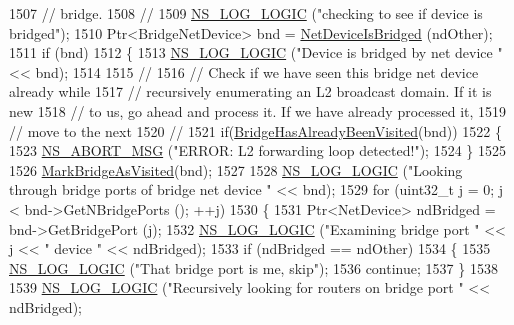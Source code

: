 \begin{DoxyCode}
1507       \textcolor{comment}{// bridge.}
1508       \textcolor{comment}{//}
1509       \hyperlink{group__logging_ga88acd260151caf2db9c0fc84997f45ce}{NS\_LOG\_LOGIC} (\textcolor{stringliteral}{"checking to see if device is bridged"});
1510       Ptr<BridgeNetDevice> bnd = \hyperlink{classns3_1_1GlobalRouter_ad330b65439cd1be39799b52df948f98b}{NetDeviceIsBridged} (ndOther);
1511       \textcolor{keywordflow}{if} (bnd)
1512         \{
1513           \hyperlink{group__logging_ga88acd260151caf2db9c0fc84997f45ce}{NS\_LOG\_LOGIC} (\textcolor{stringliteral}{"Device is bridged by net device "} << bnd);
1514 
1515           \textcolor{comment}{// }
1516           \textcolor{comment}{// Check if we have seen this bridge net device already while}
1517           \textcolor{comment}{// recursively enumerating an L2 broadcast domain. If it is new }
1518           \textcolor{comment}{// to us, go ahead and process it. If we have already processed it,}
1519           \textcolor{comment}{// move to the next}
1520           \textcolor{comment}{// }
1521           \textcolor{keywordflow}{if}(\hyperlink{classns3_1_1GlobalRouter_ab358e6c36f04f05c42a4ca2c472c3179}{BridgeHasAlreadyBeenVisited}(bnd))
1522             \{
1523               \hyperlink{group__fatal_ga51ac4699be799d772ae7258d1ef6af21}{NS\_ABORT\_MSG} (\textcolor{stringliteral}{"ERROR: L2 forwarding loop detected!"});
1524             \}
1525 
1526           \hyperlink{classns3_1_1GlobalRouter_a27297efb3e69712604932d5275ab2abb}{MarkBridgeAsVisited}(bnd);
1527 
1528           \hyperlink{group__logging_ga88acd260151caf2db9c0fc84997f45ce}{NS\_LOG\_LOGIC} (\textcolor{stringliteral}{"Looking through bridge ports of bridge net device "} << bnd);
1529           \textcolor{keywordflow}{for} (uint32\_t j = 0; j < bnd->GetNBridgePorts (); ++j)
1530             \{
1531               Ptr<NetDevice> ndBridged = bnd->GetBridgePort (j);
1532               \hyperlink{group__logging_ga88acd260151caf2db9c0fc84997f45ce}{NS\_LOG\_LOGIC} (\textcolor{stringliteral}{"Examining bridge port "} << j << \textcolor{stringliteral}{" device "} << ndBridged);
1533               \textcolor{keywordflow}{if} (ndBridged == ndOther)
1534                 \{
1535                   \hyperlink{group__logging_ga88acd260151caf2db9c0fc84997f45ce}{NS\_LOG\_LOGIC} (\textcolor{stringliteral}{"That bridge port is me, skip"});
1536                   \textcolor{keywordflow}{continue};
1537                 \}
1538 
1539               \hyperlink{group__logging_ga88acd260151caf2db9c0fc84997f45ce}{NS\_LOG\_LOGIC} (\textcolor{stringliteral}{"Recursively looking for routers on bridge port "} << ndBridged);

\end{DoxyCode}
